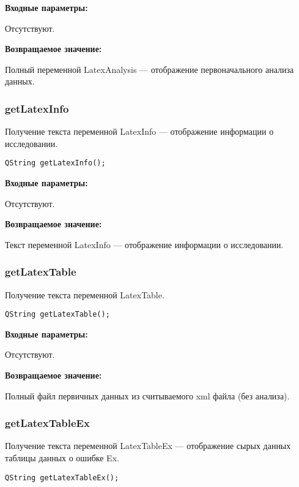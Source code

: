 \textbf{Входные параметры:}

Отсутствуют.

\textbf{Возвращаемое значение:}

Полный переменной LatexAnalysis --- отображение первоначального анализа данных.


\subsubsection{getLatexInfo}\label{getLatexInfo}

Получение текста переменной LatexInfo --- отображение информации о исследовании.


\begin{lstlisting}[label=code_syntax_getLatexInfo,caption=Синтаксис]
QString getLatexInfo();
\end{lstlisting}

\textbf{Входные параметры:}

Отсутствуют.

\textbf{Возвращаемое значение:}

Текст переменной LatexInfo --- отображение информации о исследовании.


\subsubsection{getLatexTable}\label{getLatexTable}

Получение текста переменной LatexTable.


\begin{lstlisting}[label=code_syntax_getLatexTable,caption=Синтаксис]
QString getLatexTable();
\end{lstlisting}

\textbf{Входные параметры:}

Отсутствуют.

\textbf{Возвращаемое значение:}

Полный файл первичных данных из считываемого xml файла (без анализа).


\subsubsection{getLatexTableEx}\label{getLatexTableEx}

Получение текста переменной LatexTableEx --- отображение сырых данных таблицы данных о ошибке Ex.


\begin{lstlisting}[label=code_syntax_getLatexTableEx,caption=Синтаксис]
QString getLatexTableEx();
\end{lstlisting}

